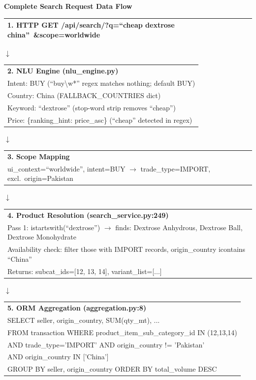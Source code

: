 \documentclass[12pt,a4paper]{article}
\begin{document}
\begin{center}
\textbf{Complete Search Request Data Flow}

\vspace{1em}
\begin{tabular}{|l|}
\hline
\textbf{1. HTTP GET /api/search/?q=``cheap dextrose china''\ \&scope=worldwide} \\
\hline
\end{tabular}

$\downarrow$

\begin{tabular}{|l|}
\hline
\textbf{2. NLU Engine (nlu\_engine.py)} \\
Intent: BUY (``buy\textbackslash w*'' regex matches nothing; default BUY) \\
Country: China (FALLBACK\_COUNTRIES dict) \\
Keyword: ``dextrose'' (stop-word strip removes ``cheap'') \\
Price: \{ranking\_hint: price\_asc\} (``cheap'' detected in regex) \\
\hline
\end{tabular}

$\downarrow$

\begin{tabular}{|l|}
\hline
\textbf{3. Scope Mapping} \\
ui\_context=``worldwide'', intent=BUY $\rightarrow$ trade\_type=IMPORT, excl.\ origin=Pakistan \\
\hline
\end{tabular}

$\downarrow$

\begin{tabular}{|l|}
\hline
\textbf{4. Product Resolution (search\_service.py:249)} \\
Pass 1: istartswith(``dextrose'') $\rightarrow$ finds: Dextrose Anhydrous, Dextrose Ball, Dextrose Monohydrate \\
Availability check: filter those with IMPORT records, origin\_country icontains ``China'' \\
Returns: subcat\_ids=[12, 13, 14], variant\_list=[...] \\
\hline
\end{tabular}

$\downarrow$

\begin{tabular}{|l|}
\hline
\textbf{5. ORM Aggregation (aggregation.py:8)} \\
SELECT seller, origin\_country, SUM(qty\_mt), ... \\
FROM transaction WHERE product\_item\_sub\_category\_id IN (12,13,14) \\
AND trade\_type='IMPORT' AND origin\_country != 'Pakistan' \\
AND origin\_country IN ['China'] \\
GROUP BY seller, origin\_country ORDER BY total\_volume DESC \\
\hline
\end{tabular}


\end{center}
\end{document}
